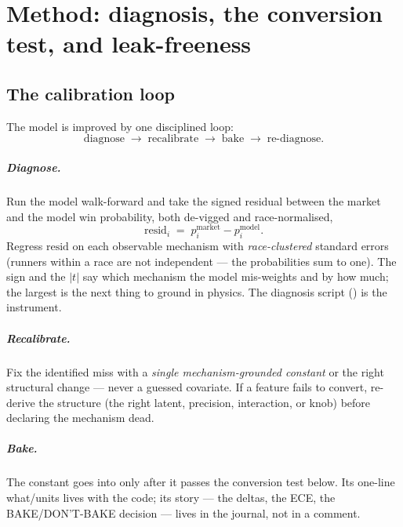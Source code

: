 \chapter{Method: diagnosis, the conversion test, and leak-freeness}
\label{ch:method}

\section{The calibration loop}

The model is improved by one disciplined loop:
\begin{equation}
  \text{diagnose} \;\longrightarrow\; \text{recalibrate} \;\longrightarrow\;
  \text{bake} \;\longrightarrow\; \text{re-diagnose}.
  \label{eq:loop}
\end{equation}

\paragraph{Diagnose.} Run the model walk-forward and take the signed residual between the market
and the model win probability, both de-vigged and race-normalised,
\begin{equation}
  \mathrm{resid}_i \;=\; p^{\text{market}}_i - p^{\text{model}}_i .
  \label{eq:resid}
\end{equation}
Regress $\mathrm{resid}$ on each observable mechanism with \emph{race-clustered} standard errors
(runners within a race are not independent --- the probabilities sum to one). The sign and the
$|t|$ say which mechanism the model mis-weights and by how much; the largest is the next thing to
ground in physics. The diagnosis script () is the instrument.

\paragraph{Recalibrate.} Fix the identified miss with a \emph{single mechanism-grounded constant}
or the right structural change --- never a guessed covariate. If a feature fails to convert,
re-derive the structure (the right latent, precision, interaction, or knob) before declaring the
mechanism dead.

\paragraph{Bake.} The constant goes into  only after it passes the
conversion test below. Its one-line what/units lives with the code; its story --- the deltas, the
ECE, the BAKE/DON'T-BAKE decision --- lives in the journal, not in a comment.

